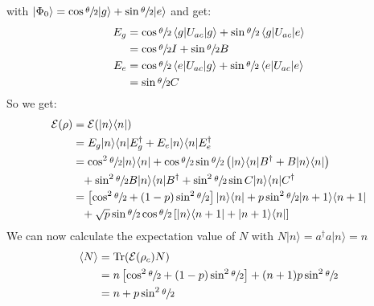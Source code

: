 \documentclass[12pt]{book}
\theoremstyle{definition}
\newcommand{\scalar}[1]{\left\langle {#1}\right\rangle}
\newcommand{\para}[1]{\left( {#1} \right)}
\newcommand{\bra}[1]{\langle {#1} \vert}
\newcommand{\ket}[1]{\vert {#1} \rangle}
\DeclareMathOperator{\tr}{Tr}
\begin{document}
with $\ket{\Phi_0} = \cos\sfrac\theta 2 \ket{g} + \sin \sfrac\theta 2 \ket{e}$ and get:
\begin{align*}
  E_g & = \cos\sfrac\theta 2 \scalar{g \vert U_{ac} \vert g} + \sin\sfrac\theta 2 \scalar{g \vert U_{ac} \vert e} \\
  & = \cos\sfrac\theta 2 I + \sin \sfrac\theta 2 B \\
  E_e & = \cos \sfrac\theta 2 \scalar{e \vert U_{ac} \vert g} + \sin\sfrac\theta 2 \scalar{e \vert U_{ac} \vert e} \\
  & = \sin\sfrac\theta 2 C
\end{align*}
So we get:
\begin{align*}
  \mathcal E(\rho) & = \mathcal E(\ket{n}\bra{n}) \\
  & = E_g \ket{n}\bra{n} E_g^\dagger + E_e \ket{n}\bra{n} E_e^\dagger \\
  & = \cos^2 \sfrac \theta 2 \ket{n}\bra{n} + \cos\sfrac \theta 2\sin\sfrac \theta 2\para{\ket{n}\bra{n} B^\dagger + B \ket{n}\bra{n}} \\
  & \phantom{=} + \sin^2\sfrac \theta 2 B \ket{n}\bra{n} B^\dagger + \sin^2\sfrac \theta 2\sin C \ket{n}\bra{n} C^\dagger \\
  & = \left[\cos^2\sfrac \theta 2 + (1-p) \sin^2\sfrac \theta 2\right] \ket{n}\bra{n} + p \sin^2 \sfrac \theta 2 \ket{n+1} \bra{n+1} \\
  & \phantom{=} + \sqrt{p} \sin\sfrac \theta 2\cos\sfrac \theta 2 \left[ \ket{n} \bra{n+1} + \ket{n+1}\bra{n}\right] \\
\end{align*}
We can now calculate the expectation value of $N$ with $N \ket{n} = a^\dagger a \ket{n} = n$
\begin{align*}
  \scalar{N} & = \tr(\mathcal E(\rho_c) N) \\
  & = n \left[\cos^2 \sfrac \theta 2 + (1 - p)\sin^2\sfrac \theta 2\right] + (n+1) p \sin^2 \sfrac \theta 2 \\
  & = n + p \sin^2 \sfrac \theta 2
\end{align*}
\end{document}
